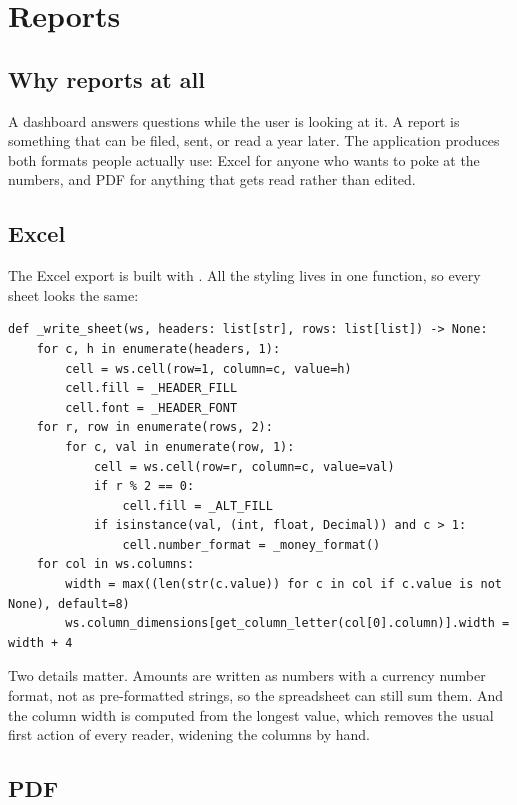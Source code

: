 \chapter{Reports}
\label{ch:reports}

\section{Why reports at all}

A dashboard answers questions while the user is looking at it. A report is
something that can be filed, sent, or read a year later. The application
produces both formats people actually use: Excel for anyone who wants to poke at
the numbers, and PDF for anything that gets read rather than edited.

\section{Excel}

The Excel export is built with . All the styling lives in one
function, so every sheet looks the same:

\begin{lstlisting}[style=py]
def _write_sheet(ws, headers: list[str], rows: list[list]) -> None:
    for c, h in enumerate(headers, 1):
        cell = ws.cell(row=1, column=c, value=h)
        cell.fill = _HEADER_FILL
        cell.font = _HEADER_FONT
    for r, row in enumerate(rows, 2):
        for c, val in enumerate(row, 1):
            cell = ws.cell(row=r, column=c, value=val)
            if r % 2 == 0:
                cell.fill = _ALT_FILL
            if isinstance(val, (int, float, Decimal)) and c > 1:
                cell.number_format = _money_format()
    for col in ws.columns:
        width = max((len(str(c.value)) for c in col if c.value is not None), default=8)
        ws.column_dimensions[get_column_letter(col[0].column)].width = width + 4
\end{lstlisting}

Two details matter. Amounts are written as numbers with a currency number
format, not as pre-formatted strings, so the spreadsheet can still sum them. And
the column width is computed from the longest value, which removes the usual
first action of every reader, widening the columns by hand.

\section{PDF}

